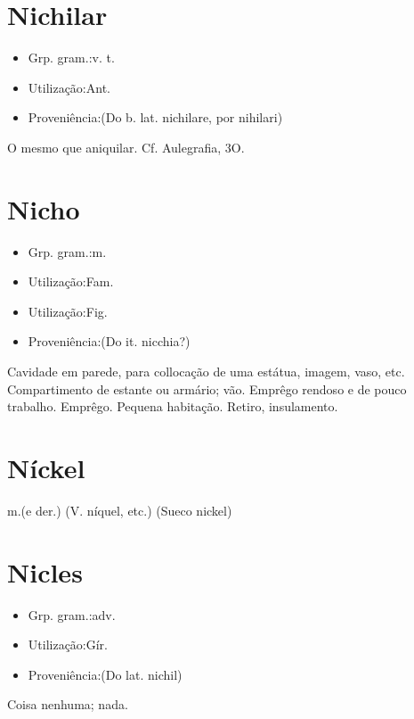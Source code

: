 \section{Nichilar}
\begin{itemize}
\item {Grp. gram.:v. t.}
\end{itemize}
\begin{itemize}
\item {Utilização:Ant.}
\end{itemize}
\begin{itemize}
\item {Proveniência:(Do b. lat. \textunderscore nichilare\textunderscore , por \textunderscore nihilari\textunderscore )}
\end{itemize}
O mesmo que \textunderscore aniquilar\textunderscore . Cf. \textunderscore Aulegrafia\textunderscore , 3O.
\section{Nicho}
\begin{itemize}
\item {Grp. gram.:m.}
\end{itemize}
\begin{itemize}
\item {Utilização:Fam.}
\end{itemize}
\begin{itemize}
\item {Utilização:Fig.}
\end{itemize}
\begin{itemize}
\item {Proveniência:(Do it. \textunderscore nicchia\textunderscore ?)}
\end{itemize}
Cavidade em parede, para collocação de uma estátua, imagem, vaso, etc.
Compartimento de estante ou armário; vão.
Emprêgo rendoso e de pouco trabalho.
Emprêgo.
Pequena habitação.
Retiro, insulamento.
\section{Níckel}
\textunderscore m.\textunderscore  (e der.)
(V. \textunderscore níquel\textunderscore , etc.)
(Sueco \textunderscore nickel\textunderscore )
\section{Nicles}
\begin{itemize}
\item {Grp. gram.:adv.}
\end{itemize}
\begin{itemize}
\item {Utilização:Gír.}
\end{itemize}
\begin{itemize}
\item {Proveniência:(Do lat. \textunderscore nichil\textunderscore )}
\end{itemize}
Coisa nenhuma; nada.
